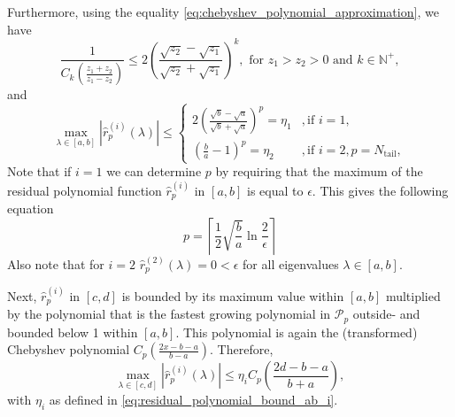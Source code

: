Furthermore, using the equality \cref{eq:chebyshev_polynomial_approximation}, we have
\begin{equation}
    \frac{1}{C_{k}\left(\frac{z_1 + z_2}{z_1 - z_2}\right)} \leq 2 \left(\frac{\sqrt{z_2} - \sqrt{z_1}}{\sqrt{z_2} + \sqrt{z_1}}\right)^k, \text{ for } z_1 > z_2 > 0 \text{ and } k \in \mathbb{N}^+,
    \label{eq:chebyshev_polynomial_bound}
\end{equation}
and
\begin{equation}
    \max_{\lambda \in [a,b]} |\hat{r}^{(i)}_p(\lambda)| \leq
    \begin{cases}
        2\left(\frac{\sqrt{b}-\sqrt{a}}{\sqrt{b}+\sqrt{a}}\right)^p=\eta_1 &, \text{if } i = 1,\\
        \left(\frac{b}{a}-1\right)^p=\eta_2 &, \text{if } i = 2, p = N_{\text{tail}},
    \end{cases}
    \label{eq:residual_polynomial_bound_ab_i}
\end{equation}
Note that if $i=1$ we can determine $p$ by requiring that the maximum of the residual polynomial function $\hat{r}^{(i)}_p$ in $[a,b]$ is equal to $\epsilon$. This gives the following equation
\begin{equation}
    p = \left\lceil\frac{1}{2}\sqrt{\frac{b}{a}}\ln{\frac{2}{\epsilon}}\right\rceil
    \label{eq:chebyshev_degree_p}
\end{equation}
Also note that for $i=2$ $\hat{r}^{(2)}_p(\lambda) = 0 < \epsilon$ for all eigenvalues $\lambda \in [a,b]$.

Next, $\hat{r}^{(i)}_p$ in $[c,d]$ is bounded by its maximum value within $[a,b]$ multiplied by the polynomial that is the fastest growing polynomial in $\mathcal{P}_{p}$ outside- and bounded below 1 within $[a,b]$. This polynomial is again the (transformed) Chebyshev polynomial $C_{p}\left(\frac{2x - b - a}{b - a}\right)$. Therefore,
\begin{equation*}
    \max_{\lambda \in [c,d]} |\hat{r}^{(i)}_p(\lambda)| \leq \eta_i C_{p}\left(\frac{2d - b - a}{b + a}\right),
\end{equation*}
with $\eta_i$ as defined in \cref{eq:residual_polynomial_bound_ab_i}.

